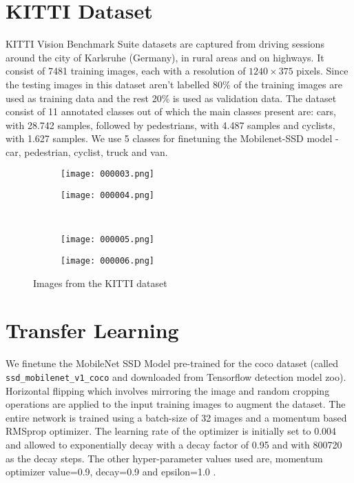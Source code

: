 \documentclass{article}
\newcommand{\code}[1]{\texttt{#1}}
\begin{document}
\section{KITTI Dataset}

KITTI Vision Benchmark Suite datasets \cite{geiger2012we} are captured
from driving sessions around the city of Karlsruhe (Germany),
in rural areas and on highways. It consist of 7481 training images, each with a resolution of $1240\times 375$ pixels. Since the testing images in this dataset aren't labelled 80\% of the training images are used as training data and the rest 20\% is used as validation data. The dataset consist of 11 annotated classes out of which the main classes present are: cars, with
28.742 samples, followed by pedestrians, with 4.487 samples and cyclists, with 1.627 samples. We use 5 classes for finetuning the Mobilenet-SSD model - car, pedestrian, cyclist, truck and van.
\begin{figure}[H]
	\centering
	\begin{subfigure}[b]{0.475\textwidth}
		\texttt{[image: 000003.png]}
	\end{subfigure}
	\begin{subfigure}[b]{0.475\textwidth}
		\texttt{[image: 000004.png]}
	\end{subfigure}
	\\
	\begin{subfigure}[b]{0.475\textwidth}
		\texttt{[image: 000005.png]}
	\end{subfigure}
	\begin{subfigure}[b]{0.475\textwidth}
		\texttt{[image: 000006.png]}
	\end{subfigure}
	\caption{Images from the KITTI dataset}
\end{figure}

\section{Transfer Learning}

We finetune the MobileNet SSD Model pre-trained for the coco dataset (called \code{ssd\_mobilenet\_v1\_coco} and downloaded from Tensorflow detection model zoo). Horizontal flipping which involves mirroring the image and random cropping operations are applied to the input training images to augment the dataset. The entire network is trained using a batch-size of 32 images and a momentum based RMSprop optimizer. The learning rate of the optimizer is initially set to 0.004 and allowed to exponentially decay with a decay factor of 0.95 and with 800720 as the decay steps. The other hyper-parameter values used are, momentum optimizer value=0.9, decay=0.9 and epsilon=1.0 .  
\end{document}
